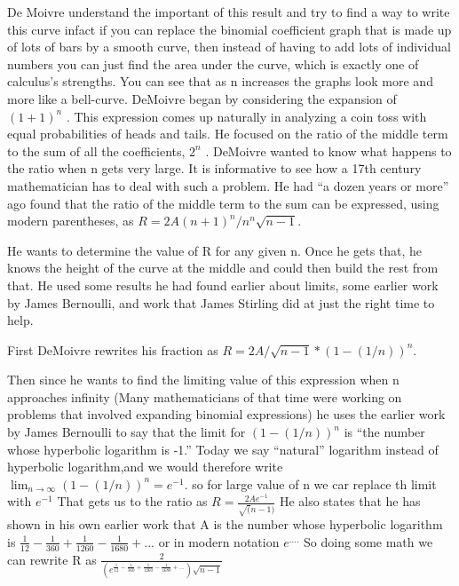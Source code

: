 \documentclass{article}
\begin{document}
De Moivre understand the important of this result and try to find a way to write this curve
infact if you can replace the binomial coefficient graph that is made up of lots of bars by a smooth curve, then
instead of having to add lots of individual numbers you can just find the area under the curve, which is
exactly one of calculus’s strengths. You can see that as n increases the graphs look more and more like a
bell-curve.
DeMoivre began by considering the expansion of $ (1+1)^{n} $ . This expression comes up naturally in
analyzing a coin toss with equal probabilities of heads and tails. He focused on the ratio of the middle
term to the sum of all the coefficients, $ 2^n $ .
DeMoivre wanted to know what happens to the ratio when n gets very large. It is informative to see how a 17th century mathematician has to deal with such a problem.
He had “a dozen years or more” ago found that the ratio of the middle term to the sum can be expressed, using modern parentheses, as  $ R= 2A(n+1)^{n} / n^{n} \sqrt{n-1} $.

He wants to determine the value of R for any given n. Once he gets that, he knows the height of the curve at the middle and could then build the rest from that. He used some results he had found earlier about limits, some earlier work by James Bernoulli, and work that James Stirling did at just the right time to help.

First DeMoivre rewrites his fraction as   $ R= 2A/ \sqrt{n-1} * (1-(1/n))^{n} $.

Then since he wants to find the limiting value of this expression when n approaches infinity (Many mathematicians of that time were working on problems that involved expanding binomial expressions) he uses the earlier work by James Bernoulli to say that the limit for $ (1-(1/n))^{n} $ is “the number
whose hyperbolic logarithm is -1.” Today we say “natural” logarithm instead of hyperbolic logarithm,and we would therefore write $ \lim_{n\to\infty}  (1-(1/n))^{n}  = e^{-1}  $.
so for large value of n we car replace th limit with $ e^{-1} $
That gets us to the ratio as $ R=  \frac {2Ae^{-1}}{\sqrt(n-1)} $
He also states that he has shown in his own earlier work that A is the number whose hyperbolic logarithm is $ \frac{1}{12} - \frac{1}{360} + \frac{1}{1260} - \frac{1}{1680} + ...  $  or in modern notation $ e^{....} $
So doing some math we can rewrite R as $ \frac{2}{(e^{ \frac{1}{12} - \frac{1}{360} + \frac{1}{1260} - \frac{1}{1680} + ... }) \sqrt{n-1}  } $
\end{document}
